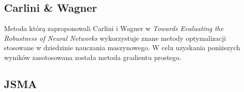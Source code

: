 \documentclass[
    left=2.5cm,         %
    right=2.5cm,        %
    top=2.5cm,          %
    bottom=3cm,         %
    bindingoffset=6mm,  %
    nohyphenation=false %
]{eiti/eiti-thesis}
\begin{document}
\subsection{Carlini \& Wagner}
Metoda którą zaproponowali Carlini i Wagner w \textit{Towards Evaluating the Robustness of Neural Networks}\cite{DBLP:journals/corr/CarliniW16a}
wykorzystuje znane metody optymalizacji stosowane w dziedzinie nauczania maszynowego. W celu uzyskania poniższych wyników zasotosowana została
metoda gradientu prostego.
\subsection{JSMA}





\end{document}
